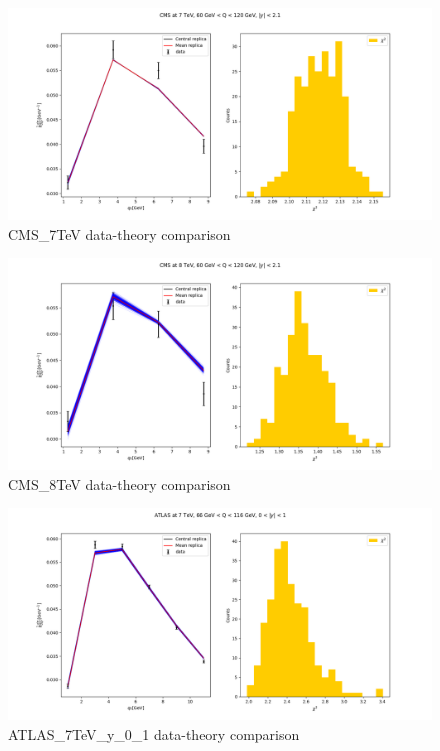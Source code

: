 \documentclass[
]{article}
\begin{document}
\begin{figure}
\centering
\includegraphics{pngplots/CMS_7TeV.png}
\caption{CMS\_7TeV data-theory comparison}
\end{figure}

\begin{figure}
\centering
\includegraphics{pngplots/CMS_8TeV.png}
\caption{CMS\_8TeV data-theory comparison}
\end{figure}

\begin{figure}
\centering
\includegraphics{pngplots/ATLAS_7TeV_y_0_1.png}
\caption{ATLAS\_7TeV\_y\_0\_1 data-theory comparison}
\end{figure}
\end{document}
